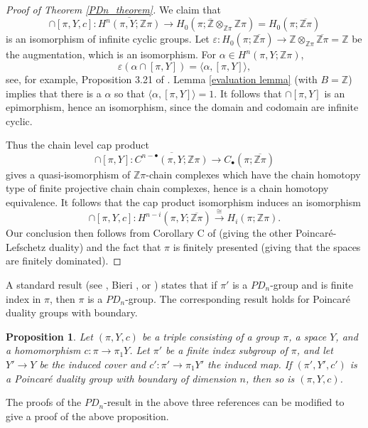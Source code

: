 \documentclass[12pt]{amsart}
\newtheorem{proposition}[theorem]{Proposition}
\theoremstyle{definition}
\newcommand{\Z}{\mathbb Z}
\newcommand{\ol}[1]{{\overline{#1}}}
\begin{document}
\begin{proof}[Proof of Theorem \ref{PDn_theorem}]
We  claim that
$$
\cap [\pi, Y,c] : \ol{H^{n}(\pi,Y; \Z\pi)} \to  H_0(\pi; \ol\Z \otimes_{\Z\pi} \Z\pi) =H_0(\pi; \ol{\Z\pi}) 
$$
is an isomorphism of infinite cyclic groups. 
Let $\varepsilon : H_0(\pi; \ol{\Z\pi}  ) \to \Z \otimes_{\Z\pi} \ol{\Z\pi} = \Z$ be the augmentation, which is an isomorphism.   For $\alpha  \in H^n(\pi,Y; \Z\pi)$, 
$$
\varepsilon (\alpha \cap [\pi, Y]) = \langle \alpha, [\pi, Y] \rangle,
$$
see, for example, Proposition 3.21 of \cite{DK}.  Lemma \ref{evaluation lemma} (with $B = \Z$) implies that there is a $\alpha $ so that 
$\langle \alpha, [\pi, Y] \rangle = 1$.   It follows that $\cap [\pi, Y]$ is an epimorphism, hence an isomorphism, since the domain and codomain are infinite cyclic.

Thus the chain level cap product 
$$
\cap [\pi, Y] : \ol{C^{n-\bullet}(\pi,Y; \Z\pi)} \to C_\bullet(\pi; \ol{\Z\pi})
$$
gives a quasi-isomorphism of $\Z\pi$-chain complexes which have the chain homotopy type of finite projective chain chain complexes, hence is a chain homotopy equivalence.    It follows that the cap product isomorphism induces an isomorphism 
$$
 \cap[\pi,Y,c] : H^{n-i}(\pi,Y; \ol{\Z\pi} ) \xrightarrow{\cong}  H_{i}(\pi; \Z\pi).
$$
 Our conclusion then follows from Corollary C of \cite{KQS} (giving the other Poincar\'e-Lefschetz duality) and the fact that $\pi$ is finitely presented (giving that the spaces are finitely dominated).
 





\end{proof}


A standard result (see \cite{JW}, Bieri \cite{Bieri}, or 
 \cite{Brown}) states that if $\pi'$ is a $PD_n$-group and is finite index in $\pi$, then $\pi$ is a $PD_n$-group.    The corresponding result holds for Poincar\'e duality groups with boundary.
 
\begin{proposition}
Let $(\pi,Y,c)$ be a triple consisting of a group $\pi$, a space $Y$, and a homomorphism $c : \pi \to \pi_1Y$.   Let $\pi'$ be a finite index subgroup of $\pi$, and let $Y' \to Y$ be the induced cover and $c' : \pi' \to \pi_1Y'$ the induced map.  If $(\pi',Y',c')$ is a Poincar\'e duality  group with boundary of dimension $n$, then so is $(\pi,Y,c)$.
\end{proposition}

The proofs of the $PD_n$-result in the above three references can be  modified to give a proof of the above proposition.
\end{document}
